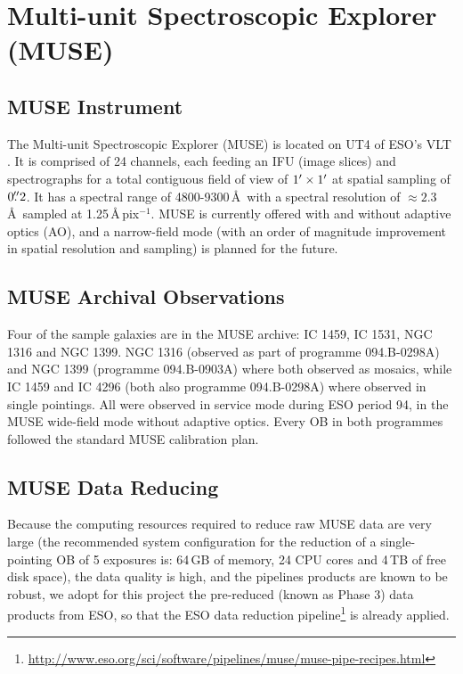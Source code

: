 		
\section{Multi-unit Spectroscopic Explorer (MUSE)}
	\label{sec:MUSE}

	\subsection{MUSE Instrument}
		The Multi-unit Spectroscopic Explorer (MUSE) is located on UT4 of ESO's VLT \citep{Bacon2010}. It is comprised of 24 channels, each feeding an IFU (image slices) and spectrographs for a total contiguous field of view of $1\hbox{$^\prime$} \times 1\hbox{$^\prime$}$ at spatial sampling of $0\hbox{$.\!\!^{\prime\prime}$}2$. It has a spectral range of 4800-9300\,\AA\ with a spectral resolution of $\approx 2.3$\,\AA\ sampled at 1.25\,\AA\,pix$^{-1}$. MUSE is currently offered with and without adaptive optics (AO), and a narrow-field mode (with an order of magnitude improvement in spatial resolution and sampling) is planned for the future. 
		
	\subsection{MUSE Archival Observations}
		Four of the sample galaxies are in the MUSE archive: IC 1459, IC 1531, NGC 1316 and NGC 1399. NGC 1316 (observed as part of programme 094.B-0298A) and NGC 1399 (programme 094.B-0903A) where both observed as mosaics, while IC 1459 and IC 4296 (both also programme 094.B-0298A) where observed in single pointings. All were observed in service mode during ESO period 94, in the MUSE wide-field mode without adaptive optics. Every OB in both programmes followed the standard MUSE calibration plan.

	\subsection{MUSE Data Reducing}
		\label{subsec:MUSEreduction}
		
		Because the computing resources required to reduce raw MUSE data are very large (the recommended system configuration for the reduction of a single-pointing OB of 5 exposures is: 64\,GB of memory, 24 CPU cores and 4\,TB of free disk space), the data quality is high, and the pipelines products are known to be robust, we adopt for this project the pre-reduced (known as Phase 3) data products from ESO, so that the ESO data reduction pipeline\footnote{\url{http://www.eso.org/sci/software/pipelines/muse/muse-pipe-recipes.html}} is already applied. 

